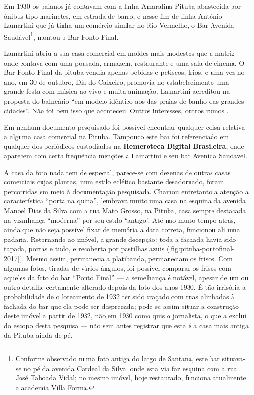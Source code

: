 \begin{citacao}
Em 1930 os baianos já contavam com a linha Amaralina-Pituba abastecida por ônibus tipo marinetes, em estrada de barro, e nesse fim de linha Antônio Lamartini que já tinha um comércio similar no Rio Vermelho, o Bar Avenida Saudável\footnote{Conforme observado numa foto antiga do largo de Santana, este bar situava-se no pé da avenida Cardeal da Silva, onde esta via faz esquina com a rua José Taboada Vidal; no mesmo imóvel, hoje restaurado, funciona atualmente a academia Villa Forma.}, montou o Bar Ponto Final.

Lamartini abriu a sua casa comercial em moldes mais modestos que a matriz onde contava com uma pousada, armazem, restaurante e uma sala de cinema. O Bar Ponto Final da pituba vendia apenas bebidas e petiscos, frios, e uma vez no ano, em 30 de outubro, Dia do Caixeiro, promovia no estabelecimento uma grande festa com música ao vivo e muita animação. Lamartini acreditou na proposta do balneário ``em modelo idêntico aos das praias de banho das grandes cidades''. Não foi bem isso que aconteceu. Outros interesses, outros rumos \cite{cadena_pituba_2012}.
\end{citacao}

Em nenhum documento pesquisado foi possível encontrar qualquer coisa relativa a alguma casa comercial na Pituba. Tampouco este bar foi referenciado em qualquer dos periódicos custodiados na \textbf{Hemeroteca Digital Brasileira}, onde aparecem com certa frequência menções a Lamartini e seu bar Avenida Saudável.

A casa da foto nada tem de especial, parece-se com dezenas de outras casas comerciais cujas plantas, num estilo eclético bastante desadornado, foram percorridas em meio à documentação pesquisada. Chamou entretanto a atenção a característica ``porta na quina'', lembrava muito uma casa na esquina da avenida Manoel Dias da Silva com a rua Mato Grosso, na Pituba, casa sempre destacada na vizinhança ``moderna'' por seu estilo ``antigo''. Até não muito tempo atrás, ainda que não seja possível fixar de memória a data correta, funcionou ali uma padaria. Retornando ao imóvel, a grande decepção: toda a fachada havia sido tapada, portas e tudo, e recoberta por pastilhas azuis (\autoref{fig:pituba-pontofinal-2017}). Mesmo assim, permanecia a platibanda, permaneciam os frisos. Com algumas fotos, tiradas de vários ângulos, foi possível comparar os frisos com aqueles da foto do bar ``Ponto Final'' --- a semelhança é notável, apesar de um ou outro detalhe certamente alterado depois da foto dos anos 1930. É tão irrisória a probabilidade de o loteamento de 1932 ter sido traçado com ruas alinhadas à fachada do bar que ela pode ser desprezada; pode-se assim situar a construção deste imóvel a partir de 1932, não em 1930 como quis o jornalista, o que a exclui do escopo desta pesquisa --- não sem antes registrar que esta é a casa mais antiga da Pituba ainda de pé.

